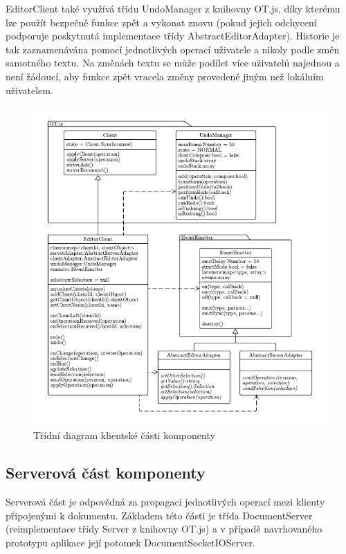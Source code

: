 EditorClient také využívá třídu UndoManager z knihovny OT.js, díky kterému lze použít bezpečně funkce zpět a vykonat znovu (pokud jejich odchycení podporuje poskytnutá implementace třídy AbstractEditorAdapter).
Historie je tak zaznamenávána pomocí jednotlivých operací uživatele a nikoly podle změn samotného textu.
Na změnách textu se může podílet více uživatelů najednou a není žádoucí, aby funkce zpět vracela změny provedené jiným než lokálním uživatelem.

\begin{figure}[ht!]
    \centering
    \includegraphics[width=\textwidth]{partials/navrh/EditorClient.pdf}
    \caption{Třídní diagram klientské části komponenty}\label{fig:EditorClient}
\end{figure}

\subsection{Serverová část komponenty}\label{subsec:serverováČást}

Serverová část je odpovědná za propagaci jednotlivých operací mezi klienty připojenými k dokumentu.
Základem této části je třída DocumentServer (reimplementace třídy Server z knihovny OT.js) a v případě navrhovaného prototypu aplikace její potomek DocumentSocketIOServer.

